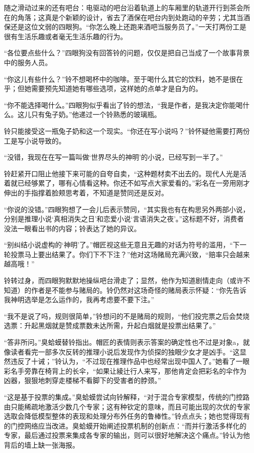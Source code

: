 随之滑动过来的还有吧台：电驱动的吧台沿着轨道上的车厢里的轨道开行到茶会所在的角落；这真是个新颖的设计，省去了酒保在吧台内到处跑动的辛劳；尤其当酒保还是这位文弱的四眼狗。“你怎么晚上还跑来酒吧当服务员了。”一天打两份工是很有生活乐趣或者毫无生活乐趣的行为。

“各位要点些什么？”四眼狗没有回答铃的问题，仅仅是把自己当成了一个故事背景中的服务人员。

“你这儿有些什么？”铃不想喝杯中的咖啡。至于喝什么其它的饮料，她不是很在乎；但她需要预先知道她有哪些选项，这样她的点单才是自为的。

“你不能选择喝什么。”四眼狗似乎看出了铃的想法，“我是作者，是我决定你能喝什么。这儿只有兔子奶。”他递过一个铃熟悉的玻璃瓶。

铃只能接受这一瓶兔子奶和这一个现实。“你还在写小说吗？”铃怀疑他需要打两份工是写小说导致的。

“没错，我现在在写一篇叫做‘世界尽头的神明’的小说，已经写到一半了。”

铃赶紧开口阻止他接下来可能的自夸自卖，“这种题材卖不出去的。现代人光是活着就已经够累了，哪有心情看这种。你还不如写点大家爱看的。”彩名在一旁用刚才伸出的手指撑着脸颊思考着，不知道是赞同还是反对。

“你说的没错。”四眼狗想了一会儿后表示赞同，“其实我也有在构思另外两部小说，分别是推理小说‘真相消失之日’和恋爱小说‘言语消失之夜’。”这标题不好，消费者没法一眼看出书的内容；铃表达了她的异议。

“别纠结小说虚构的‘神明’了。”帽匠视这些无意且无趣的对话为符号的滥用，“下一轮投票马上要出结果了。你们下不下注？”他对这场赌局充满兴致，“赔率只会越来越高哦！”

铃转过身，而四眼狗默默地操纵吧台滑走了；显然，他作为知道剧情走向（或许不知道）的作者是不能参与赌局的。铃仍然对这场奇怪的赌局表示怀疑：“你先告诉我神明选举是怎么运作的，我再考虑要不要下注。”

“我不是说了吗，规则很简单，”铃想问的不是赌局的规则，“他们投完票之后会焚烧选票：升起黑烟就是赞成票数未达所需，升起白烟就是投票出结果了。”

“答非所问。”臭蛤蟆替铃指出。帽匠的表情则表示答案的确定性也不过是对象a，就像读者看完一部多次反转的推理小说后发现作为侦探的独眼少女才是凶手。“这显然违反了十诫；”铃认为，“不过现在推理作品中也经常出现中国人了。”她看了一眼彩名手旁靠在椅背上的长伞，“如果让{綾辻行人}来写，那他肯定会把彩名的伞作为凶器，狠狠地刺穿走楼梯不看脚下的受害者的脖颈。”

“这是基于投票的集成。”臭蛤蟆尝试向铃解释，“对于混合专家模型，传统的门控路由只能稀疏地激活少数几个专家；这有种钦定的意味，而且可能出现的次优的专家选取会降低模型整体的表现和处理分布外任务的鲁棒性。”铃点点头；她也觉得现有的门控网络应当改进。臭蛤蟆开始阐述投票机制的创新点：“而并行激活多样化的专家，最后通过投票来集成各专家的输出，则可以很好地解决这个痛点。”铃认为他背后的墙上缺一张海报。

